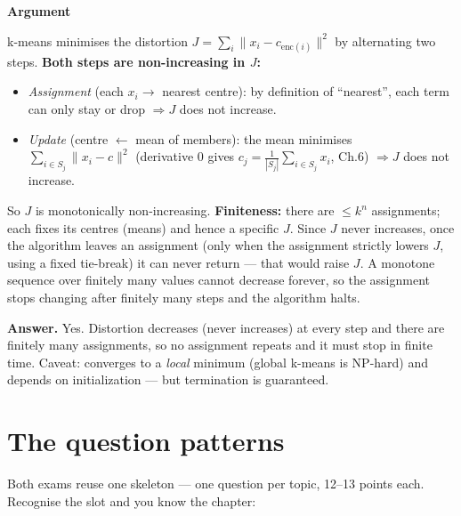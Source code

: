 \documentclass[11pt]{article}
\newcommand{\step}[1]{\smallskip\par\noindent\textbf{\textcolor{amber}{#1}}\par\nobreak}
\newcommand{\ans}[1]{\begin{answer}\textbf{Answer.} #1\end{answer}}
\begin{document}
\step{Argument}
k-means minimises the distortion $J=\sum_i\|x_i-c_{\text{enc}(i)}\|^2$ by alternating two steps.
\textbf{Both steps are non-increasing in $J$:}
\begin{itemize}
  \item \emph{Assignment} (each $x_i\to$ nearest centre): by definition of ``nearest'', each term can only stay or
  drop $\Rightarrow J$ does not increase.
  \item \emph{Update} (centre $\gets$ mean of members): the mean minimises $\sum_{i\in S_j}\|x_i-c\|^2$ (derivative
  $0$ gives $c_j=\frac{1}{|S_j|}\sum_{i\in S_j}x_i$, Ch.6) $\Rightarrow J$ does not increase.
\end{itemize}
So $J$ is monotonically non-increasing. \textbf{Finiteness:} there are $\le k^n$ assignments; each fixes its
centres (means) and hence a specific $J$. Since $J$ never increases, once the algorithm leaves an assignment
(only when the assignment strictly lowers $J$, using a fixed tie-break) it can never return --- that would raise
$J$. A monotone sequence over finitely many values cannot decrease forever, so the assignment stops changing after
finitely many steps and the algorithm halts.
\ans{Yes. Distortion decreases (never increases) at every step and there are finitely many assignments, so no
assignment repeats and it must stop in finite time. Caveat: converges to a \emph{local} minimum (global k-means is
NP-hard) and depends on initialization --- but termination is guaranteed.}

\section{The question patterns}

Both exams reuse one skeleton --- one question per topic, 12--13 points each. Recognise the slot and you know the
chapter:
\end{document}
